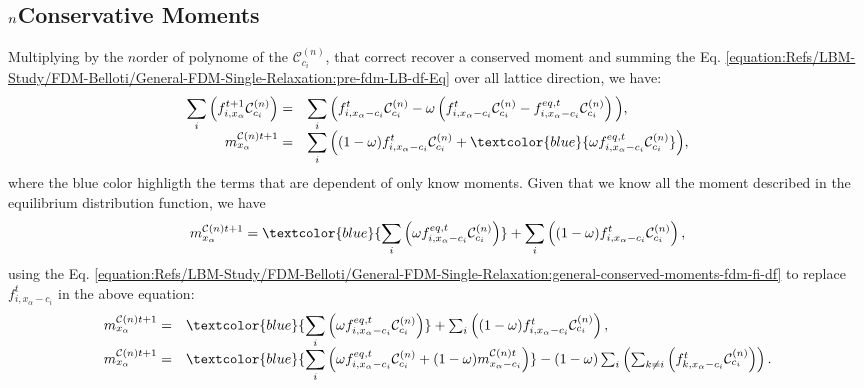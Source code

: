 \documentclass[letterpaper,10pt,english,openany,oneside]{jupyterBook}
\begin{document}
\subsection{\protect\(n\protect\)\sphinxhyphen{}Conservative Moments}
\label{\detokenize{Refs/LBM-Study/FDM-Belloti/General-FDM-Single-Relaxation:n-conservative-moments}}
\sphinxAtStartPar
Multiplying by the \(n\)\sphinxhyphen{}order of polynome of the \(\mathcal{C}_{c_{i}}^{(n)}\), that correct recover a conserved moment and summing the Eq. \eqref{equation:Refs/LBM-Study/FDM-Belloti/General-FDM-Single-Relaxation:pre-fdm-LB-df-Eq} over all lattice direction, we have:
\begin{equation*}
\begin{split}
\begin{array}{rl}
\displaystyle\sum_{i}\Big( f_{i,x_{\alpha}}^{t+1}\mathcal{C}_{c_{i}}^{(n)} \Big) = & \displaystyle\sum_{i}\Big( f_{i,x_{\alpha}-c_{i}}^{t}\mathcal{C}_{c_{i}}^{(n)}  - \omega \left( f_{i,x_{\alpha}-c_{i}}^{t}\mathcal{C}_{c_{i}}^{(n)} - f_{i,x_{\alpha}-c_{i}}^{eq,t}\mathcal{C}_{c_{i}}^{(n)} \right) \Big), \\
m_{x_{\alpha}}^{\mathcal{C}(n)t+1} = & \displaystyle\sum_{i}\Big( (1-\omega) f_{i,x_{\alpha}-c_{i}}^{t}\mathcal{C}_{c_{i}}^{(n)}  + \textcolor{blue}{\omega f_{i,x_{\alpha}-c_{i}}^{eq,t}\mathcal{C}_{c_{i}}^{(n)} }\Big),
\end{array}
\end{split}
\end{equation*}
\sphinxAtStartPar
where the blue color highligth the terms that are dependent of only know moments. Given that we know all the moment described in the equilibrium distribution function, we have
\begin{equation*}
\begin{split}
m_{x_{\alpha}}^{\mathcal{C}(n)t+1} = \textcolor{blue}{\sum_{i}\left(\omega f_{i,x_{\alpha}-c_{i}}^{eq,t}\mathcal{C}_{c_{i}}^{(n)} \right)} + \sum_{i}\left( (1-\omega) f_{i,x_{\alpha}-c_{i}}^{t}\mathcal{C}_{c_{i}}^{(n)}  \right),
\end{split}
\end{equation*}
\sphinxAtStartPar
using the Eq. \eqref{equation:Refs/LBM-Study/FDM-Belloti/General-FDM-Single-Relaxation:general-conserved-moments-fdm-fi-df} to replace \(f_{i,x_{\alpha}-c_{i}}^{t}\) in the above equation:
\begin{equation*}
\begin{split}
\begin{array}{rl}
m_{x_{\alpha}}^{\mathcal{C}(n)t+1} = & \textcolor{blue}{\displaystyle\sum_{i}\left(\omega f_{i,x_{\alpha}-c_{i}}^{eq,t}\mathcal{C}_{c_{i}}^{(n)} \right)} + \sum_{i}\left( (1-\omega) f_{i,x_{\alpha}-c_{i}}^{t}\mathcal{C}_{c_{i}}^{(n)}  \right), \\
m_{x_{\alpha}}^{\mathcal{C}(n)t+1} = & \textcolor{blue}{\displaystyle\sum_{i}\left(\omega f_{i,x_{\alpha}-c_{i}}^{eq,t}\mathcal{C}_{c_{i}}^{(n)} + (1-\omega)m_{x_{\alpha}-c_{i}}^{\mathcal{C}(n)t} \right)} - (1-\omega) \sum_{i}\left( \sum_{k\neq i} \left(f_{k,x_{\alpha}-c_{i}}^{t}\mathcal{C}_{c_{i}}^{(n)}  \right) \right).
\end{array}
\end{split}
\end{equation*}
\end{document}
